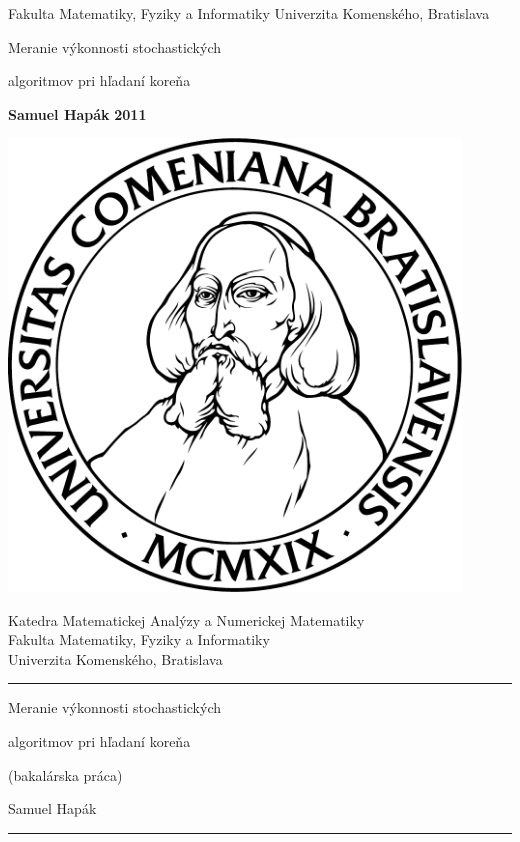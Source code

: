 \documentclass[a4paper,12pt]{article}
\def\firsttitle{Meranie výkonnosti stochastických}
\def\secondtitle{algoritmov pri hľadaní koreňa}
\def\mfthesistype{bakalárska práca}
\def\mfauthor{Samuel Hapák}
\def\mfdate{2011}
\begin{document}
\pagestyle{empty}

\begin{center}
{\Large\sc Fakulta Matematiky, Fyziky a Informatiky}
{\Large\sc Univerzita Komenského, Bratislava}
\end{center}
\vfill
\begin{center}

\centerline{\Huge\sc\firsttitle}

\bigskip

\centerline{\Huge\sc\secondtitle}
\end{center}

\vfill
{\bf \mfauthor}
\hfill{\bf \mfdate}
\eject %

\noindent
\begin{minipage}{0.20\textwidth}
\includegraphics[width=0.9\textwidth]{komlogo-new}
\end{minipage}
\begin{minipage}{0.79\textwidth}
\begin{center}
\sc Katedra Matematickej Analýzy a Numerickej Matematiky \\
Fakulta Matematiky, Fyziky a Informatiky \\
Univerzita Komenského, Bratislava
\end{center}
\end{minipage}

\begin{center}
\begin{minipage}{0.8\textwidth}
\hrule
\bigskip\bigskip
\centerline{\Large\sc\firsttitle}
\smallskip
\centerline{\Large\sc\secondtitle}
\smallskip
\centerline{(\mfthesistype)}
\bigskip
\bigskip
\centerline{\large\sc\mfauthor}
\bigskip\bigskip
\hrule
\end{minipage}
\end{center}
\vfill
\end{document}
